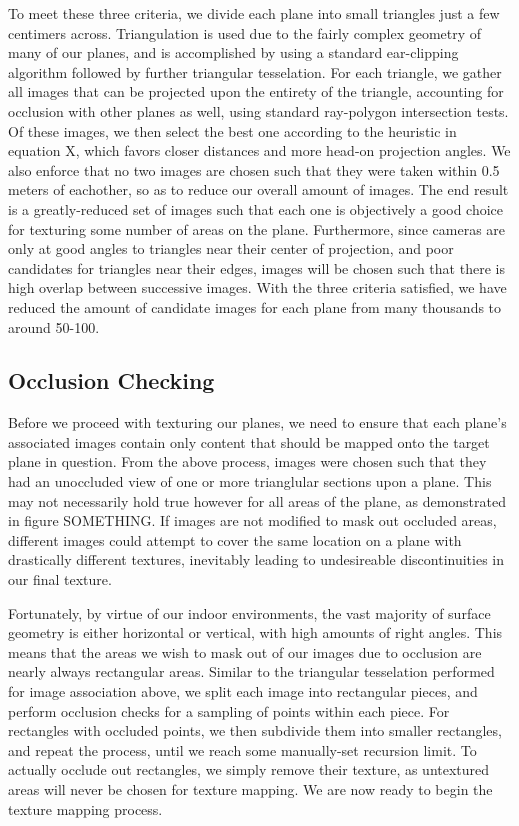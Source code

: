 \documentclass[10pt,twocolumn,letterpaper]{article}
\begin{document}
To meet these three criteria, we divide each plane into small triangles just a few centimers across. Triangulation is used due to the fairly complex
geometry of many of our planes, and is accomplished by using a
standard ear-clipping algorithm followed by further triangular
tesselation. For each triangle, we gather all images that can be
projected upon the entirety of the triangle, accounting for occlusion
with other planes as well, using standard ray-polygon intersection
tests. Of these images, we then select the best one
according to the heuristic in equation X, which favors closer distances
and more head-on projection angles. We also enforce that no two images
are chosen such that they were taken within 0.5 meters of eachother,
so as to reduce our overall amount of images. The end result is a
greatly-reduced set of images such that each one is objectively a good choice for texturing some number of areas on the plane. Furthermore, since cameras are only at good
angles to triangles near their center of projection, and poor
candidates for triangles near their edges, images will be chosen such
that there is high overlap between successive images. With the three criteria satisfied, we have reduced the amount of candidate images for
each plane from many thousands to around 50-100.

\subsection{Occlusion Checking}
Before we proceed with texturing our planes, we need to ensure that
each plane's associated images contain only content that should be
mapped onto the target plane in question. From the above process,
images were chosen such that they had an unoccluded view of one or
more trianglular sections upon a plane. This may not necessarily hold
true however for all areas of the plane, as demonstrated in figure
SOMETHING. If images are not modified to mask out occluded areas,
different images could attempt to cover the same location on a plane
with drastically different textures, inevitably leading to
undesireable discontinuities in our final texture.

Fortunately, by virtue of our indoor environments, the vast majority
of surface geometry is either horizontal or vertical, with high
amounts of right angles. This means that the areas we wish to mask out
of our images due to occlusion are nearly always rectangular
areas. Similar to the triangular tesselation performed for image
association above, we split each image into rectangular pieces, and
perform occlusion checks for a sampling of points within each
piece. For rectangles with occluded points, we then subdivide them
into smaller rectangles, and repeat the process, until we reach some
manually-set recursion limit. To actually occlude out rectangles, we
simply remove their texture, as untextured areas will never be chosen
for texture mapping. We are now ready to begin the texture mapping
process.
\end{document}
